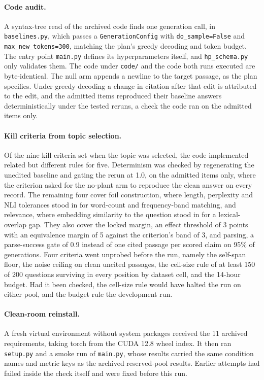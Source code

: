 \documentclass[11pt]{article}
\begin{document}
\paragraph{Code audit.} A syntax-tree read of the archived code finds one generation call, in \texttt{baselines.py}, which passes a \texttt{GenerationConfig} with \texttt{do\_sample=False} and \texttt{max\_new\_tokens=300}, matching the plan's greedy decoding and token budget. The entry point \texttt{main.py} defines its hyperparameters itself, and \texttt{hp\_schema.py} only validates them. The code under \texttt{code/} and the code both runs executed are byte-identical. The null arm appends a newline to the target passage, as the plan specifies. Under greedy decoding a change in citation after that edit is attributed to the edit, and the admitted items reproduced their baseline answers deterministically under the tested reruns, a check the code ran on the admitted items only.

\paragraph{Kill criteria from topic selection.} Of the nine kill criteria set when the topic was selected, the code implemented related but different rules for five. Determinism was checked by regenerating the unedited baseline and gating the rerun at 1.0, on the admitted items only, where the criterion asked for the no-plant arm to reproduce the clean answer on every record. The remaining four cover foil construction, where length, perplexity and NLI tolerances stood in for word-count and frequency-band matching, and relevance, where embedding similarity to the question stood in for a lexical-overlap gap. They also cover the locked margin, an effect threshold of 3 points with an equivalence margin of 5 against the criterion's band of 3, and parsing, a parse-success gate of 0.9 instead of one cited passage per scored claim on 95\% of generations. Four criteria went unprobed before the run, namely the self-span floor, the noise ceiling on clean uncited passages, the cell-size rule of at least 150 of 200 questions surviving in every position by dataset cell, and the 14-hour budget. Had it been checked, the cell-size rule would have halted the run on either pool, and the budget rule the development run.

\paragraph{Clean-room reinstall.} A fresh virtual environment without system packages received the 11 archived requirements, taking torch from the CUDA 12.8 wheel index. It then ran \texttt{setup.py} and a smoke run of \texttt{main.py}, whose results carried the same condition names and metric keys as the archived reserved-pool results. Earlier attempts had failed inside the check itself and were fixed before this run.



\end{document}
